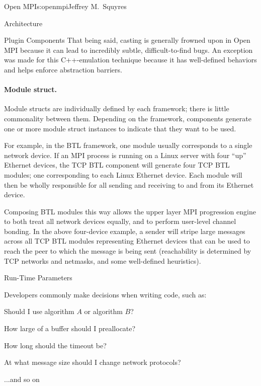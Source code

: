 \begin{aosachapter}{Open MPI}{s:openmpi}{Jeffrey M.\ Squyres}
\begin{aosasect1}{Architecture}
\begin{aosasect2}{Plugin Components}
That being said, casting is generally frowned upon in Open MPI because
it can lead to incredibly subtle, difficult-to-find bugs.  
%
An exception was made for this C++-emulation technique because it has
well-defined behaviors and helps enforce abstraction barriers.


\paragraph{Module struct.}

Module structs are individually defined by each framework; there is
little commonality between them.
%
Depending on the framework, components generate one or more module
struct instances to indicate that they want to be used.

For example, in the BTL framework, one module usually corresponds to a
single network device.  
%
If an MPI process is running on a Linux server with four ``up''
Ethernet devices, the TCP BTL component will generate four TCP BTL
modules; one corresponding to each Linux Ethernet device.
%
Each module will then be wholly responsible for all sending and
receiving to and from its Ethernet device.

Composing BTL modules this way allows the upper layer MPI progression
engine to both treat all network devices equally, and to perform
user-level channel bonding.  
%
In the above four-device example, a sender will stripe large messages
across all TCP BTL modules representing Ethernet devices that can be
used to reach the peer to which the message is being sent
(reachability is determined by TCP networks and netmasks, and some
well-defined heuristics).

\end{aosasect2}


\begin{aosasect2}{Run-Time Parameters}

Developers commonly make decisions when writing code, such as:

\begin{aosaitemize}
\item Should I use algorithm $A$ or algorithm $B$?
\item How large of a buffer should I preallocate?
\item How long should the timeout be?
\item At what message size should I change network protocols?
\item ...and so on
\end{aosaitemize}


\end{aosasect2}
\end{aosasect1}
\end{aosachapter}
